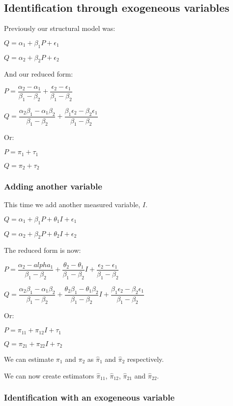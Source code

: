 
\subsection{Identification through exogeneous variables}

Previously our structural model was:

\(Q=\alpha_1 + \beta_1 P + \epsilon_1 \)

\(Q=\alpha_2 + \beta_2 P + \epsilon_2 \)

And our reduced form:

\(P =\dfrac{\alpha_2-\alpha_1 }{\beta_1-\beta_2}+\dfrac{\epsilon_2-\epsilon_1 }{\beta_1-\beta_2}\)

\(Q =\dfrac{\alpha_2\beta_1-\alpha_1\beta_2 }{\beta_1-\beta_2}+\dfrac{\beta_1\epsilon_2 -\beta_2\epsilon_1}{\beta_1-\beta_2}\)

Or:

\(P=\pi_1 + \tau_1 \)

\(Q= \pi_2 + \tau_2\)

\subsubsection{Adding another variable}

This time we add another measured variable, \(I\).

\(Q=\alpha_1 + \beta_1 P + \theta_1 I + \epsilon_1 \)

\(Q=\alpha_2 + \beta_2 P + \theta_2 I + \epsilon_2 \)

The reduced form is now:

\(P =\dfrac{\alpha_2 -alpha_1 }{\beta_1-\beta_2}+\dfrac{\theta_2-\theta_1 }{\beta_1-\beta_2}I+\dfrac{\epsilon_2-\epsilon_1}{\beta_1-\beta_2}\)

\(Q =\dfrac{\alpha_2\beta_1-\alpha_1\beta_2 }{\beta_1-\beta_2}+\dfrac{\theta_2\beta_1-\theta_1\beta_2}{\beta_1-\beta_2}I+\dfrac{\beta_1\epsilon_2 -\beta_2\epsilon_1}{\beta_1-\beta_2}\)

Or:

\(P =\pi_{11} +\pi_{12}I + \tau_1 \)

\(Q= \pi_{21} +\pi_{22}I + \tau_2 \)

We can estimate \(\pi_1 \) and \(\pi_2 \) as \(\hat \pi_1\) and \(\hat \pi_2\) respectively.

We can now create estimators \(\hat \pi_{11}\), \(\hat \pi_{12}\), \(\hat \pi_{21}\) and \(\hat \pi_{22}\).

\subsubsection{Identification with an exogeneous variable}

